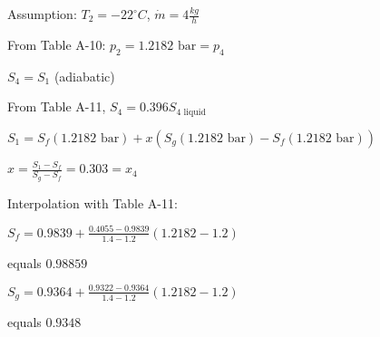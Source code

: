 Assumption: \( T_2 = -22^\circ C \), \( \dot{m} = 4 \frac{kg}{h} \)

From Table A-10: \( p_2 = 1.2182 \text{ bar} = p_4 \)

\( S_4 = S_1 \) (adiabatic)

From Table A-11, \( S_4 = 0.396 S_{4 \text{ liquid}} \)

\( S_1 = S_f (1.2182 \text{ bar}) + x (S_g (1.2182 \text{ bar}) - S_f (1.2182 \text{ bar})) \)

\( x = \frac{S_1 - S_f}{S_g - S_f} = 0.303 = x_4 \)

Interpolation with Table A-11:

\( S_f = 0.9839 + \frac{0.4055 - 0.9839}{1.4 - 1.2} (1.2182 - 1.2) \)

equals \( 0.98859 \)

\( S_g = 0.9364 + \frac{0.9322 - 0.9364}{1.4 - 1.2} (1.2182 - 1.2) \)

equals \( 0.9348 \)